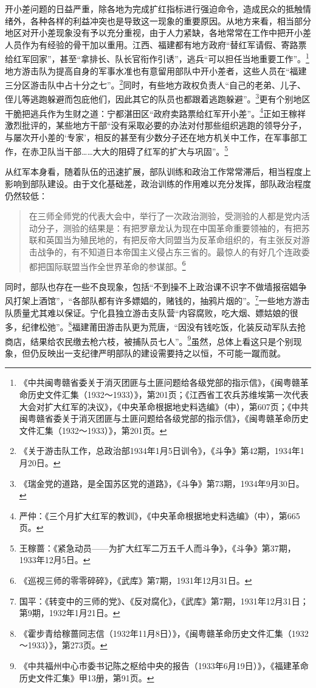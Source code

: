 开小差问题的日益严重，除各地为完成扩红指标进行强迫命令，造成民众的抵触情绪外，各种各样的利益冲突也是导致这一现象的重要原因。从地方来看，相当部分地区对开小差现象没有予以充分重视，由于人力紧缺，各地常常在工作中把开小差人员作为有经验的骨干加以重用。江西、福建都有地方政府“替红军请假、寄路票给红军回家”，甚至“拿排长、队长官衔作引诱”，逃兵“可以担任当地重要工作”。\footnote{《中共闽粤赣省委关于消灭团匪与土匪问题给各级党部的指示信》，《闽粤赣革命历史文件汇集（1932～1933）》，第201页；《江西省工农兵苏维埃第一次代表大会对扩大红军的决议》，《中央革命根据地史料选编》（中），第607页；《中共闽粤赣省委关于消灭团匪与土匪问题给各级党部的指示信》，《闽粤赣革命历史文件汇集（1932～1933）》，第201页。}地方游击队为提高自身的军事水准也有意留用部队中开小差者，这些人员在“福建三分区游击队中占十分之七”。\footnote{《关于游击队工作，总政治部1934年1月5日训令》，《斗争》第42期，1934年1月20日。}同时，有些地方政权负责人“自己的老弟、儿子、侄儿等逃跑躲避而包庇他们，因此其它的队员也都跟着逃跑躲避”。\footnote{《瑞金党的道路，是全国苏区党的道路》，《斗争》第73期，1934年9月30日。}更有个别地区干脆把逃兵作为生财之道：宁都湛田区“政府卖路票给红军开小差”。\footnote{严仲：《三个月扩大红军的教训》，《中央革命根据地史料选编》（中），第665页。}正如王稼祥激烈批评的，某些地方干部“没有采取必要的办法对付那些组织逃跑的领导分子，与屡次开小差的‘专家’，相反的甚至有少数分子还在地方机关中工作，在军事部工作，在赤卫队当干部……大大的阻碍了红军的扩大与巩固”。\footnote{王稼蔷：《紧急动员——为扩大红军二万五千人而斗争》，《斗争》第37期，1933年12月5日。}


从红军本身看，随着队伍的迅速扩展，部队训练和政治工作常常滞后，相当程度上影响到部队建设。由于文化基础差，政治训练的作用难以充分发挥，部队政治程度仍然较低：

\begin{quote}

在三师全师党的代表大会中，举行了一次政治测验，受测验的人都是党内活动分子，测验的结果是：有把罗章龙认为现在中国革命重要领袖的，有把苏联和英国当为殖民地的，有把反帝大同盟当为反革命组织的，有主张反对游击战争的，有不知道日本帝国主义侵占东三省的。最惊人的有好几个连政委都把国际联盟当作全世界革命的参谋部。\footnote{《巡视三师的零零碎碎》，《武库》第7期，1931年12月31日。}
\end{quote}


同时，部队也存在一些不良现象，包括“不到操不上政治课不识字不做墙报宿娼争风打架上酒馆”，“各部队都有许多嫖娼的，赌钱的，抽鸦片烟的”。\footnote{国平：《转变中的三师的党》、《反对腐化》，《武库》第7期，1931年12月31日；第9期，1932年1月21日。}一些地方游击队质量尤其难以保证。宁化县独立游击支队营“内容腐败，吃大烟、嫖姑娘的很多，纪律松弛”。\footnote{《霍步青给稼蔷同志信（1932年11月8日）》，《闽粤赣革命历史文件汇集（1932～1933）》，第273页。}福建莆田游击队更为荒唐，“因没有钱吃饭，化装反动军队去抢商店，结果给农民缴去枪六枝，被捕队员七人”。\footnote{《中共福州中心市委书记陈之枢给中央的报告（1933年6月19日）》，《福建革命历史文件汇集》甲13册，第91页。}虽然，总体上看这只是个别现象，但仍反映出一支纪律严明部队的建设需要持之以恒，不可能一蹴而就。


